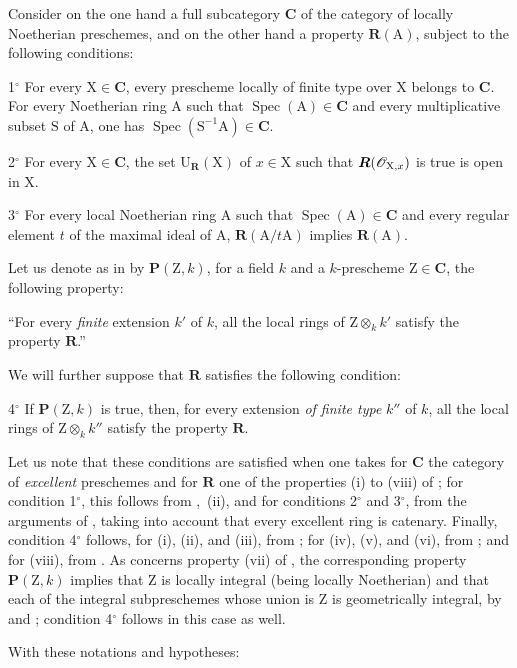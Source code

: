 \begin{env}[7.9.7]
\label{IV.7.9.7}
Consider on the one hand a full subcategory $\boldsymbol{C}$ of the category of locally Noetherian preschemes, and on the other hand a property $\boldsymbol{R}(\mathrm{A})$, subject to the following conditions:

1${}^\circ$ For every $\mathrm{X}\in\boldsymbol{C}$, every prescheme locally of finite type over $\mathrm{X}$ belongs to $\boldsymbol{C}$. For every Noetherian ring $\mathrm{A}$ such that $\operatorname{Spec}(\mathrm{A})\in\boldsymbol{C}$ and every multiplicative subset $\mathrm{S}$ of $\mathrm{A}$, one has $\operatorname{Spec}(\mathrm{S}^{-1}\mathrm{A})\in\boldsymbol{C}$.

2${}^\circ$ For every $\mathrm{X}\in\boldsymbol{C}$, the set $\mathrm{U}_{\mathbf{R}}(\mathrm{X})$ of $x\in\mathrm{X}$ such that $\boldsymbol{R}(\mathscr{O}_{\mathrm{X},x})$ is true is open in $\mathrm{X}$.

3${}^\circ$ For every local Noetherian ring $\mathrm{A}$ such that $\operatorname{Spec}(\mathrm{A})\in\boldsymbol{C}$ and every regular element $t$ of the maximal ideal of $\mathrm{A}$, $\boldsymbol{R}(\mathrm{A}/t\mathrm{A})$ implies $\boldsymbol{R}(\mathrm{A})$.

Let us denote as in  by $\boldsymbol{P}(\mathrm{Z},k)$, for a field $k$ and a $k$-prescheme $\mathrm{Z}\in\boldsymbol{C}$, the following property:

``For every \emph{finite} extension $k'$ of $k$, all the local rings of $\mathrm{Z}\otimes_k k'$ satisfy the property $\boldsymbol{R}$.''


We will further suppose that $\boldsymbol{R}$ satisfies the following condition:

4${}^\circ$ If $\boldsymbol{P}(\mathrm{Z},k)$ is true, then, for every extension \emph{of finite type} $k''$ of $k$, all the local rings of $\mathrm{Z}\otimes_k k''$ satisfy the property $\boldsymbol{R}$.

Let us note that these conditions are satisfied when one takes for $\boldsymbol{C}$ the category of \emph{excellent} preschemes and for $\boldsymbol{R}$ one of the properties (i) to (viii) of ; for condition 1${}^\circ$, this follows from ,~(ii), and for conditions 2${}^\circ$ and 3${}^\circ$, from the arguments of , taking into account that every excellent ring is catenary. Finally, condition 4${}^\circ$ follows, for (i), (ii), and (iii), from ; for (iv), (v), and (vi), from ; and for (viii), from . As concerns property (vii) of , the corresponding property $\boldsymbol{P}(\mathrm{Z},k)$ implies that $\mathrm{Z}$ is locally integral (being locally Noetherian) and that each of the integral subpreschemes whose union is $\mathrm{Z}$ is geometrically integral, by  and ; condition 4${}^\circ$ follows in this case as well.

With these notations and hypotheses:
\end{env}

